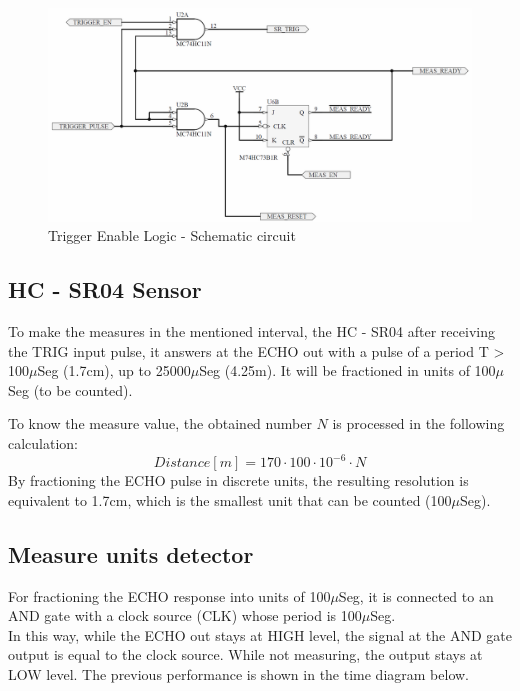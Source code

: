 \begin{figure}[H]
    \begin{centering}
        \includegraphics[width=1\textwidth]{trig_enable}
    \par\end{centering}
    \caption{Trigger Enable Logic - Schematic circuit}
\end{figure}

\subsection*{HC - SR04 Sensor}
To make the measures in the mentioned interval, the HC - SR04 
after receiving the TRIG input pulse, it answers at the ECHO out 
with a pulse of a period T > 100$\mu$Seg (1.7cm), up to 25000$\mu$Seg (4.25m).
It will be fractioned in units of 100$\mu$Seg (to be counted).
\par
To know the measure value, the obtained number $N$ is processed in the
following calculation:
\[
    Distance[m] = 170 \cdot 100 \cdot 10^{-6} \cdot N  
\]
By fractioning the ECHO pulse in discrete units, the resulting resolution is
equivalent to 1.7cm, which is the smallest unit that can be counted (100$\mu$Seg).

\subsection*{Measure units detector}

For fractioning the ECHO response into units of 100$\mu$Seg, it is 
connected to an AND gate with a clock source (CLK) whose period is 100$\mu$Seg.\\
In this way, while the ECHO out stays at HIGH level, the signal at the AND gate output 
is equal to the clock source. While not measuring, the output stays at LOW level.
The previous performance is shown in the time diagram below.

